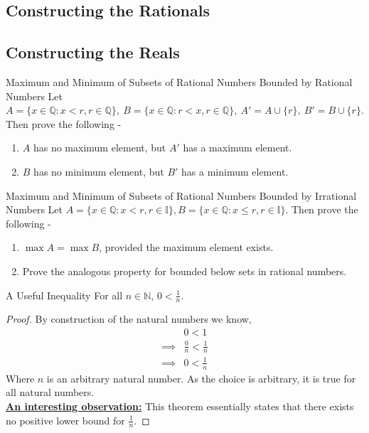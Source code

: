 \subsection{Constructing the Rationals}
\subsection{Constructing the Reals}
\begin{Theorem}{Maximum and Minimum of Subsets of Rational Numbers Bounded by Rational Numbers}
	Let \(A=\{x\in\mathbb{Q}:x<r,r\in\mathbb{Q}\},\ B=\{x\in\mathbb{Q}:r<x,r\in\mathbb{Q}\},\ A'=A\cup\{r\},\ B'=B\cup\{r\}\). Then prove the following -
	\begin{enumerate}
		\item $A$ has no maximum element, but $A'$ has a maximum element.
		\item $B$ has no minimum element, but $B'$ has a minimum element.
	\end{enumerate}
\end{Theorem}
\begin{Theorem}{Maximum and Minimum of Subsets of Rational Numbers Bounded by Irrational Numbers}
	Let $A=\{x\in\mathbb{Q}:x<r,r\in\mathbb{I}\}, B=\{x\in\mathbb{Q}:x\leq r,r\in\mathbb{I}\}$. Then prove the following -
	\begin{enumerate}
		\item $\max A=\max B$, provided the maximum element exists.
		\item Prove the analogous property for bounded below sets in rational numbers.
	\end{enumerate}
\end{Theorem}
\begin{Theorem}{A Useful Inequality}
	For all $n\in\mathbb{N}$, $0<\frac{1}{n}$.
\end{Theorem}
\begin{proof}
	By construction of the natural numbers we know,
	\begin{align*}
		& 0<1\\
		\implies & \frac{0}{n}<\frac{1}{n}\\
		\implies & 0<\frac{1}{n}
	\end{align*}
	Where $n$ is an arbitrary natural number. As the choice is arbitrary, it is true for all natural numbers.\\
	\textbf{\underline{An interesting observation:}} This theorem essentially states that there exists no positive lower bound for $\frac{1}{n}$.
\end{proof}

